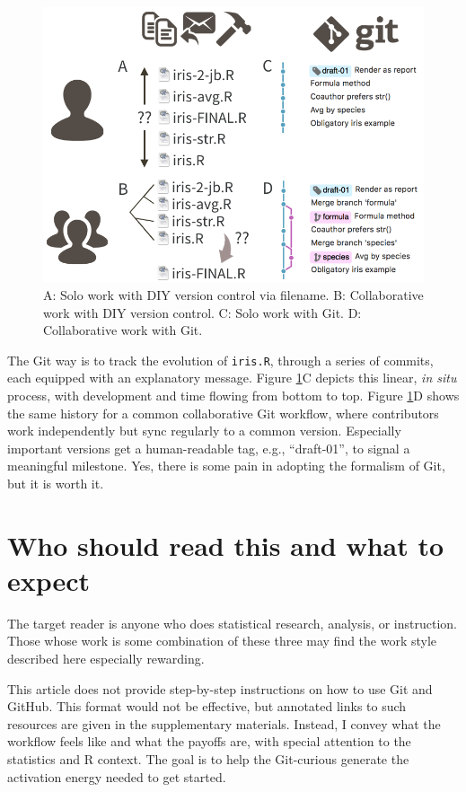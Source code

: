 \documentclass[12pt]{article}
\begin{document}
\begin{figure}
\includegraphics[width=1\linewidth]{diy-vs-git-solo-vs-collab} \caption{\label{fig:diy-vs-git}A: Solo work with DIY version control via filename. B: Collaborative work with DIY version control. C: Solo work with Git. D: Collaborative work with Git.}\label{fig:diy-vs-git}
\end{figure}

The Git way is to track the evolution of \texttt{iris.R}, through a
series of commits, each equipped with an explanatory message. Figure
\ref{fig:diy-vs-git}C depicts this linear, \emph{in situ} process, with
development and time flowing from bottom to top. Figure
\ref{fig:diy-vs-git}D shows the same history for a common collaborative
Git workflow, where contributors work independently but sync regularly
to a common version. Especially important versions get a human-readable
tag, e.g., ``draft-01'', to signal a meaningful milestone. Yes, there is
some pain in adopting the formalism of Git, but it is worth it.

\section{Who should read this and what to
expect}\label{who-should-read-this-and-what-to-expect}

The target reader is anyone who does statistical research, analysis, or
instruction. Those whose work is some combination of these three may
find the work style described here especially rewarding.

This article does not provide step-by-step instructions on how to use
Git and GitHub. This format would not be effective, but annotated links
to such resources are given in the supplementary materials. Instead, I
convey what the workflow feels like and what the payoffs are, with
special attention to the statistics and R context. The goal is to help
the Git-curious generate the activation energy needed to get started.
\end{document}
